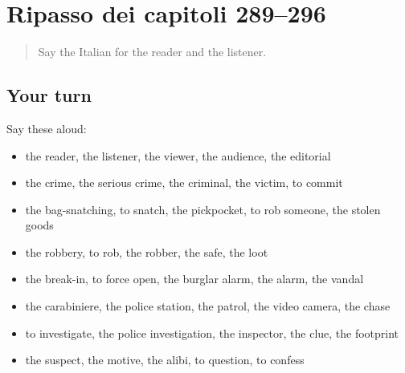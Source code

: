 \section[(dialogue)]{Ripasso dei capitoli 289–296}

\label{lesson:IT-R296-ripasso-289-296}



\begin{quote}
Say the Italian for the reader and the listener.
\end{quote}

\subsection*{Your turn}
Say these aloud:

\begin{itemize}
\raggedright
  \item the reader, the listener, the viewer, the audience, the editorial
  \item the crime, the serious crime, the criminal, the victim, to commit
  \item the bag-snatching, to snatch, the pickpocket, to rob someone, the stolen goods
  \item the robbery, to rob, the robber, the safe, the loot
  \item the break-in, to force open, the burglar alarm, the alarm, the vandal
  \item the carabiniere, the police station, the patrol, the video camera, the chase
  \item to investigate, the police investigation, the inspector, the clue, the footprint
  \item the suspect, the motive, the alibi, to question, to confess
\end{itemize}

